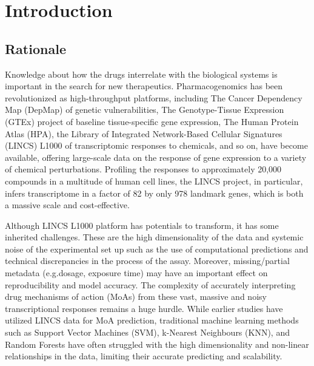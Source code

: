 \documentclass[twocolumn,12pt,a4paper]{article}
\begin{document}
\twocolumn
\section{Introduction}
\subsection{Rationale}
Knowledge about how the drugs interrelate with the biological systems is important in the search for new therapeutics. Pharmacogenomics has been revolutionized as high-throughput platforms, including The Cancer Dependency Map (DepMap) of genetic vulnerabilities, The Genotype-Tissue Expression (GTEx) project of baseline tissue-specific gene expression, The Human Protein Atlas (HPA), the Library of Integrated Network-Based Cellular Signatures (LINCS) L1000 of transcriptomic responses to chemicals, and so on, have become available, offering large-scale data on the response of gene expression to a variety of chemical perturbations. Profiling the responses to approximately 20,000 compounds in a multitude of human cell lines, the LINCS project, in particular, infers transcriptome in a factor of 82 by only 978 landmark genes, which is both a massive scale and cost-effective\cite{subramanian2017next,mcdermott2019deep}.

Although LINCS L1000 platform has potentials to transform, it has some inherited challenges. These are the high dimensionality of the data and systemic noise of the experimental set up such as the use of computational predictions and technical discrepancies in the process of the assay. Moreover, missing/partial metadata (e.g.dosage, exposure time) may have an important effect on reproducibility and model accuracy\cite{stathias2018sustainable}. The complexity of accurately interpreting drug mechanisms of action (MoAs) from these vast, massive and noisy transcriptional responses remains a huge hurdle. While earlier studies have utilized LINCS data for MoA prediction\cite{everett2023combining,gao2022deep,el2017integrative,wang2016drug,subramanian2017next,wu2022deep,liao2023open}, traditional machine learning methods such as Support Vector Machines (SVM), k-Nearest Neighbours (KNN), and Random Forests have often struggled with the high dimensionality and non-linear relationships in the data, limiting their accurate predicting and scalability\cite{li2020deep,everett2023combining}.
\end{document}
